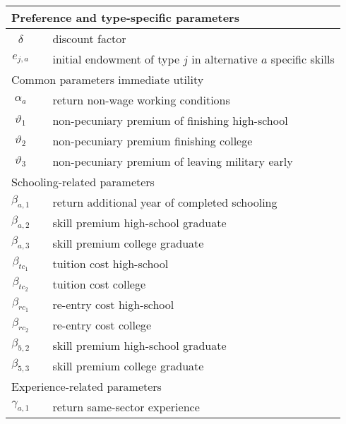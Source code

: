 \begin{ThreePartTable}
\begin{longtable}{@{}cll@{}}
		\midrule
		\multicolumn{3}{l}{Preference and type-specific parameters}																		 \\ \midrule
		$\delta$ 				&  & discount factor																			  \\
		$e_{j, a}$			&  & initial endowment of type $j$ in alternative $a$ specific skills 	  \\ [7.5pt] \midrule
		\multicolumn{3}{l}{Common parameters immediate utility}												\\ \midrule
		$\alpha_a$           &  & return non-wage working conditions		   \\
		$\vartheta_1$        &  & non-pecuniary premium of finishing high-school                 								    \\
		$\vartheta_2$        &  & non-pecuniary premium finishing college															    \\
		$\vartheta_3$        &  & non-pecuniary premium of leaving military early						  \\[7.5pt] \midrule
		\multicolumn{3}{l}{Schooling-related parameters}															   \\ \midrule
		$\beta_{a,1}$        &  & return additional year of completed schooling 								\\
		$\beta_{a,2}$        &  & skill premium high-school graduate										      \\
		$\beta_{a,3}$        &  & skill premium college graduate													   	\\
		$\beta_{tc_1}$       &  & tuition cost high-school                      											\\
		$\beta_{tc_2}$       &  & tuition cost college                          												\\
		$\beta_{rc_1}$       &  & re-entry cost high-school                     										   \\
		$\beta_{rc_2}$       &  & re-entry cost college                        												   \\
		$\beta_{5,2}$        &  & skill premium high-school graduate            									\\
		$\beta_{5,3}$        &  & skill premium college graduate                									     \\ [7.5pt] \midrule
		\multicolumn{3}{l}{Experience-related parameters}           													 \\
		\midrule
		$\gamma_{a,1}$       &  & return same-sector experience                 									 \\

\end{longtable}
\end{ThreePartTable}
